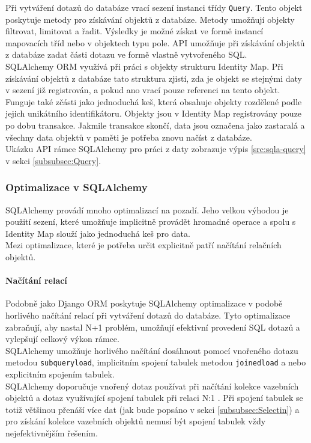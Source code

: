 \documentclass[ing,male,java,dept456]{diploma}						%
\begin{document}
Při vytváření dotazů do databáze vrací sezení instanci třídy \lstinline[style=inlinepython]|Query|. Tento objekt poskytuje metody pro získávání objektů z databáze. Metody umožňují objekty filtrovat, limitovat a řadit. Výsledky je možné získat ve formě instancí mapovacích tříd nebo v objektech typu pole. API umožňuje při získávání objektů z databáze zadat části dotazu ve formě vlastně vytvořeného SQL. \\
SQLAlchemy ORM využívá při práci s objekty strukturu Identity Map. Při získávání objektů z databáze tato struktura zjistí, zda je objekt se stejnými daty v sezení již registrován, a pokud ano vrací pouze referenci na tento objekt. Funguje také zčásti jako jednoduchá keš, která obsahuje objekty rozdělené podle jejich unikátního identifikátoru. Objekty jsou v Identity Map registrovány pouze po dobu transakce. Jakmile transakce skončí, data jsou označena jako zastaralá a všechny data objektů v paměti je potřeba znovu načíst z databáze. \\
Ukázku API rámce SQLAlchemy pro práci z daty zobrazuje výpis \ref{src:sqla-query} v sekci \ref{subsubsec:Query}.

\subsubsection{Optimalizace v SQLAlchemy}
\label{subsubsec:sqla-opt}

SQLAlchemy provádí mnoho optimalizací na pozadí. Jeho velkou výhodou je použití sezení, které umožňuje implicitně provádět hromadné operace a spolu s Identity Map slouží jako jednoduchá keš pro data. \\
Mezi optimalizace, které je potřeba určit explicitně patří načítání relačních objektů.

\paragraph{Načítání relací}
Podobně jako Django ORM poskytuje SQLAlchemy optimalizace v podobě horlivého načítání relací při vytváření dotazů do databáze. Tyto optimalizace zabraňují, aby nastal N+1 problém, umožňují efektivní provedení SQL dotazů a vylepšují celkový výkon rámce. \\
SQLAlchemy umožňuje horlivého načítání dosáhnout pomocí vnořeného dotazu metodou \lstinline[style=inlinepython]|subqueryload|, implicitním spojení tabulek metodou \lstinline[style=inlinepython]|joinedload| a nebo explicitním spojením tabulek. \\
SQLAlchemy doporučuje vnořený dotaz používat při načítání kolekce vazebních objektů a dotaz využívající spojení tabulek při relaci N:1 \cite{sqla-doc}. Při spojení tabulek se totiž většinou přenáší více dat (jak bude popsáno v sekci \ref{subsubsec:Selectin}) a pro získání kolekce vazebních objektů nemusí být spojení tabulek vždy nejefektivnějším řešením.
\end{document}
